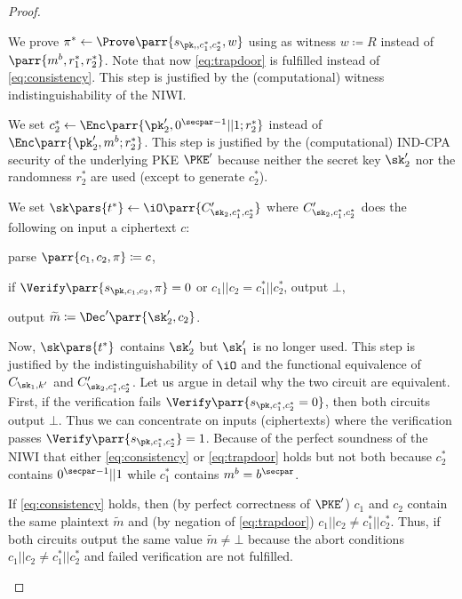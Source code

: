 \begin{proof}
\begin{hybrids}
        \item We prove \(\pi^* \gets \Prove\parr{s_{\pk,,c^*_1,c^*_2},w}\) using as witness \(w \coloneqq R\) instead of \(\parr{m^b,r^*_1,r^*_2}\).
        Note that now \cref{eq:trapdoor} is fulfilled instead of \cref{eq:consistency}.
        This step is justified by the (computational) witness indistinguishability of the NIWI.

        \item We set \(c^*_2 \gets \Enc\parr{\pk'_2,0^{\secpar-1}||1;r^*_2}\) instead of \(\Enc\parr{\pk'_2,m^b;r^*_2}\).
        This step is justified by the (computational) IND-CPA security of the underlying PKE \(\PKE'\) because neither the secret key \(\sk'_2\) nor the randomness \(r^*_2\) are used (except to generate \(c^*_2\)).

        \item We set \(\sk\pars{t^*} \gets \iO\parr{C'_{\sk_2,c^*_1,c^*_2}}\) where \(C'_{\sk_2,c^*_1,c^*_2}\) does the following on input a ciphertext \(c\):
        \begin{sitemize}
            \item parse \(\parr{c_1,c_2,\pi} \coloneqq c\),
            \item if \(\Verify\parr{s_{\pk,c_1,c_2},\pi} = 0\) or \(c_1||c_2 = c^*_1||c^*_2\), output \(\bot\),
            \item output \(\widetilde{m} \coloneqq \Dec'\parr{\sk'_2,c_2}\).
        \end{sitemize}
        Now, \(\sk\pars{t^*}\) contains \(\sk'_2\) but \(\sk'_1\) is no longer used.
        This step is justified by the indistinguishability of \(\iO\) and the functional equivalence of \(C_{\sk_1,k'}\) and \(C'_{\sk_2,c^*_1,c^*_2}\).
        Let us argue in detail why the two circuit are equivalent.
        First, if the verification fails \(\Verify\parr{s_{\pk,c^*_1,c^*_2} = 0}\),
        then both circuits output \(\bot\).
        Thus we can concentrate on inputs (ciphertexts) where the verification passes \(\Verify\parr{s_{\pk,c^*_1,c^*_2}} = 1\).
        Because of the perfect soundness of the NIWI that either \cref{eq:consistency} or \cref{eq:trapdoor} holds but not both because \(c^*_2\) contains \(0^{\secpar-1}||1\) while \(c^*_1\) contains \(m^b = b^\secpar\).
        \begin{sitemize}
            \item If \cref{eq:consistency} holds,
            then (by perfect correctness of \(\PKE'\)) \(c_1\) and \(c_2\) contain the same plaintext \(\widetilde{m}\) and (by negation of \cref{eq:trapdoor}) \(c_1||c_2 \neq c^*_1||c^*_2\).
            Thus, if both circuits output the same value \(\widetilde{m} \neq \bot\) because the abort conditions \(c_1||c_2 \neq c^*_1||c^*_2\) and failed verification are not fulfilled.


\end{sitemize}
\end{hybrids}
\end{proof}

